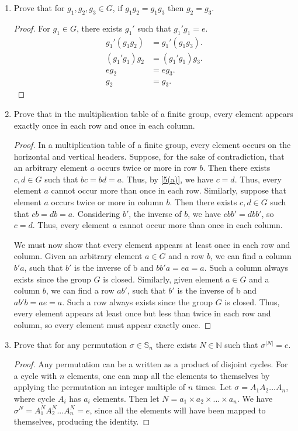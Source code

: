\documentclass{article}
\begin{document}
\begin{enumerate}[label=(\alph*)]
    \item Prove that for $g_1, g_2, g_3 \in G$, if $g_1g_2 = g_1g_3$ then $g_2 = g_3$.
    \label{5(a)}
    \begin{proof}
    For $g_1 \in G$, there exists $g_1'$ such that $g_1'g_1=e$.
    \begin{align*}
        g_1'(g_1g_2) &= g_1'(g_1g_3).\\
        (g_1'g_1)g_2 &= (g_1'g_1)g_3.\\
        eg_2 &= eg_3.\\
        g_2 &= g_3.
    \end{align*}
    \end{proof}
    \item Prove that in the multiplication table of a finite group, every element appears exactly once in each row and once in each column.
    \begin{proof}
    In a multiplication table of a finite group, every element occurs on the horizontal and vertical headers.  Suppose, for the sake of contradiction, that an arbitrary element $a$ occurs twice or more in row $b$. Then there exists $c, d \in G$ such that $bc=bd=a$. Thus, by \ref{5(a)}, we have $c=d$. Thus, every element $a$ cannot occur more than once in each row. Similarly, suppose that element $a$ occurs twice or more in column $b$. Then there exists $c, d \in G$ such that $cb=db=a$. Considering $b'$, the inverse of $b$, we have $cbb'=dbb'$, so $c=d$. Thus, every element $a$ cannot occur more than once in each column.
    \par We must now show that every element appears at least once in each row and column. Given an arbitrary element $a \in G$ and a row $b$, we can find a column $b'a$, such that $b'$ is the inverse of b and $bb'a=ea=a$. Such a column always exists since the group $G$ is closed. Similarly, given element $a \in G$ and a column $b$, we can find a row $ab'$, such that $b'$ is the inverse of b and $ab'b=ae=a$. Such a row always exists since the group $G$ is closed. Thus, every element appears at least once but less than twice in each row and column, so every element must appear exactly once. 
    \end{proof}
    \item Prove that for any permutation $\sigma \in \mathbb{S}_n$ there exists $N \in \mathbb{N}$ such that $\sigma^{|N|}=e$.
    \begin{proof}
    Any permutation can be a written as a product of disjoint cycles. For a cycle with $n$ elements, one can map all the elements to themselves by applying the permutation an integer multiple of $n$ times. Let $\sigma=A_1A_2...A_n$, where cycle $A_i$ has $a_i$ elements. Then let $N=a_1\times a_2\times...\times a_n$. We have $\sigma^N=A_1^NA_2^N...A_n^N=e$, since all the elements will have been mapped to themselves, producing the identity.

\end{proof}
\end{enumerate}
\end{document}

